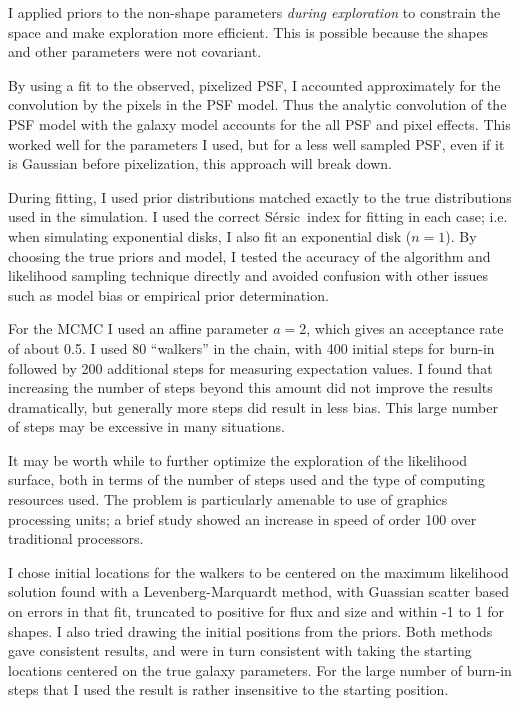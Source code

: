 \documentclass[12pt,preprint]{aastex}
\newcommand{\sersic}{S\'{e}rsic}
\begin{document}
I applied priors to the non-shape parameters {\it during exploration} to
constrain the space and make exploration more efficient.  This is possible
because the shapes and other parameters were not covariant.

By using a fit to the observed, pixelized PSF, I accounted approximately for
the convolution by the pixels in the PSF model.  Thus the analytic convolution
of the PSF model with the galaxy model accounts for the all PSF and pixel
effects.  This worked well for the parameters I used, but for a less well
sampled PSF, even if it is Gaussian before pixelization, this approach will
break down. 

During fitting, I used prior distributions matched exactly to the true
distributions used in the simulation.  I used the correct \sersic\ index for
fitting in each case; i.e. when simulating exponential disks, I also fit an
exponential disk ($n=1$).  By choosing the true priors and model, I tested the
accuracy of the algorithm and likelihood sampling technique directly and
avoided confusion with other issues such as model bias or empirical prior
determination.

For the MCMC I used an affine parameter $a=2$, which gives an acceptance rate
of about 0.5. I used 80 ``walkers'' in the chain, with 400 initial steps for
burn-in followed by 200 additional steps for measuring expectation values.  I
found that increasing the number of steps beyond this amount did not improve
the results dramatically, but generally more steps did result in less bias.
This large number of steps may be excessive in many situations.

It may be worth while to further optimize the exploration of the likelihood
surface, both in terms of the number of steps used and the type of computing
resources used.  The problem is particularly amenable to use of graphics
processing units; a brief study showed an increase in speed of order 100 over
traditional processors.

I chose initial locations for the walkers to be centered on the maximum
likelihood solution found with a Levenberg-Marquardt method, with Guassian
scatter based on errors in that fit, truncated to positive for flux and size
and within -1 to 1 for shapes.  I also tried drawing the initial positions from
the priors.  Both methods gave consistent results, and were in turn consistent
with taking the starting locations centered on the true galaxy parameters.  For
the large number of burn-in steps that I used the result is rather insensitive
to the starting position.
\end{document}
